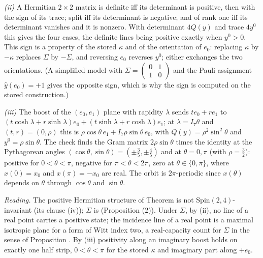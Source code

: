 \emph{(ii)} A Hermitian $2 \times 2$ matrix is definite iff its determinant is positive, then with the sign of its trace; split iff its determinant is negative; and of rank one iff its determinant vanishes and it is nonzero. With determinant $4Q(y)$ and trace $4y^{0}$ this gives the four cases, the definite lines being positive exactly when $y^{0} > 0$. This sign is a property of the stored $\kappa$ and of the orientation of $e_{0}$: replacing $\kappa$ by $-\kappa$ replaces $\Sigma$ by $-\Sigma$, and reversing $e_{0}$ reverses $y^{0}$; either exchanges the two orientations. (A simplified model with $\Sigma = \left(\begin{smallmatrix}0 & 1\\ 1 & 0\end{smallmatrix}\right)$ and the Pauli assignment $\hat y(e_{0}) = +1$ gives the opposite sign, which is why the sign is computed on the stored construction.)

\emph{(iii)} The boost of the $(e_{0}, e_{1})$ plane with rapidity $\lambda$ sends $te_{0} + re_{1}$ to $(t\cosh\lambda + r\sinh\lambda)e_{0} + (t\sinh\lambda + r\cosh\lambda)e_{1}$; at $\lambda = I_{7}\theta$ and $(t, r) = (0, \rho)$ this is $\rho\cos\theta\,e_{1} + I_{7}\rho\sin\theta\,e_{0}$, with $Q(y) = \rho^{2}\sin^{2}\theta$ and $y^{0} = \rho\sin\theta$. The check finds the Gram matrix $2\rho\sin\theta$ times the identity at the Pythagorean angles $(\cos\theta, \sin\theta) = (\pm\tfrac35, \pm\tfrac45)$ and at $\theta = 0, \pi$ (with $\rho = \tfrac32$): positive for $0 < \theta < \pi$, negative for $\pi < \theta < 2\pi$, zero at $\theta \in \{0, \pi\}$, where $x(0) = x_{0}$ and $x(\pi) = -x_{0}$ are real. The orbit is $2\pi$-periodic since $x(\theta)$ depends on $\theta$ through $\cos\theta$ and $\sin\theta$.

\emph{Reading.} The positive Hermitian structure of Theorem  is not $\mathrm{Spin}(2,4)$-invariant (its clause (iv)); $\Sigma$ is (Proposition (2)). Under $\Sigma$, by (ii), no line of a real point carries a positive state; the incidence line of a real point is a maximal isotropic plane for a form of Witt index two, a real-capacity count for $\Sigma$ in the sense of Proposition . By (iii) positivity along an imaginary boost holds on exactly one half strip, $0 < \theta < \pi$ for the stored $\kappa$ and imaginary part along $+e_{0}$.
